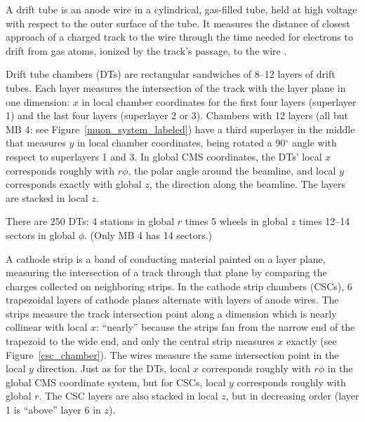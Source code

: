 \documentclass[12pt]{article}
\begin{document}
A drift tube is an anode wire in a cylindrical, gas-filled tube, held
at high voltage with respect to the outer surface of the tube.  It
measures the distance of closest approach of a charged track to the
wire through the time needed for electrons to drift from gas atoms,
ionized by the track's passage, to the wire \cite{drift_tubes}.

Drift tube chambers (DTs) are rectangular sandwiches of 8--12 layers
of drift tubes.  Each layer measures the intersection of the track
with the layer plane in one dimension: $x$ in local chamber
coordinates for the first four layers (superlayer 1) and the last four
layers (superlayer 2 or 3).  Chambers with 12 layers (all but MB 4:
see Figure~\ref{muon_system_labeled}) have a third superlayer in the
middle that measures $y$ in local chamber coordinates, being rotated a
90$^\circ$ angle with respect to superlayers 1 and 3.  In global CMS
coordinates, the DTs' local $x$ corresponds roughly with $r\phi$, the
polar angle around the beamline, and local $y$ corresponds exactly with
global $z$, the direction along the beamline.  The layers are stacked
in local $z$.

There are 250 DTs: 4 stations in global $r$ times 5 wheels in global
$z$ times 12--14 sectors in global $\phi$.  (Only MB 4 has 14
sectors.)

A cathode strip is a band of conducting material painted on a layer
plane, measuring the intersection of a track through that plane by
comparing the charges collected on neighboring strips.  In the cathode
strip chambers (CSCs), 6 trapezoidal layers of cathode planes
alternate with layers of anode wires.  The strips measure the track
intersection point along a dimension which is nearly collinear with
local $x$: ``nearly'' because the strips fan from the narrow end of
the trapezoid to the wide end, and only the central strip measures $x$
exactly (see Figure~\ref{csc_chamber}).  The wires measure the same
intersection point in the local $y$ direction.  Just as for the DTs,
local $x$ corresponds roughly with $r\phi$ in the global CMS
coordinate system, but for CSCs, local $y$ corresponds roughly with
global $r$.  The CSC layers are also stacked in local $z$, but in
decreasing order (layer 1 is ``above'' layer 6 in $z$).
\end{document}
